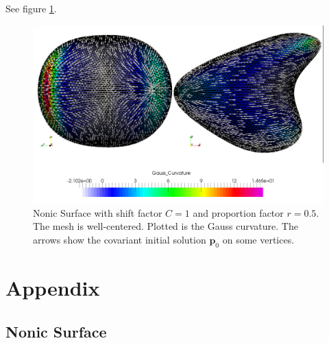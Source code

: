 \documentclass[a4paper,11pt]{scrartcl}
\newcommand{\p}{\mathbf{p}}
\begin{document}
    See figure \ref{figNonic}.
    \begin{figure}
      \centering
      \includegraphics[width=.9\textwidth]{bilder/Nonic50p_1.png}
      \caption{Nonic Surface with shift factor \( C = 1 \) and proportion factor \( r = 0.5 \).
               The mesh is well-centered.
               Plotted is the Gauss curvature.
               The arrows show the covariant initial solution \( \p_{0} \) on some vertices.}
      \label{figNonic}
    \end{figure}



\section{Appendix}

  \subsection{Nonic Surface}
    
  



\end{document}

